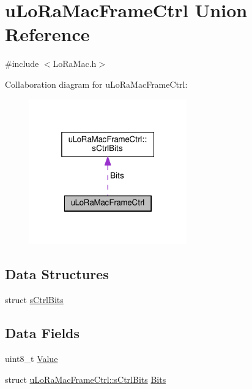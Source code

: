 \hypertarget{unionuLoRaMacFrameCtrl}{}\section{u\+Lo\+Ra\+Mac\+Frame\+Ctrl Union Reference}
\label{unionuLoRaMacFrameCtrl}


{\ttfamily \#include $<$Lo\+Ra\+Mac.\+h$>$}



Collaboration diagram for u\+Lo\+Ra\+Mac\+Frame\+Ctrl\+:
\nopagebreak
\begin{figure}[H]
\begin{center}
\leavevmode
\includegraphics[width=193pt]{unionuLoRaMacFrameCtrl__coll__graph}
\end{center}
\end{figure}
\subsection*{Data Structures}
\begin{DoxyCompactItemize}
\item 
struct \hyperlink{structuLoRaMacFrameCtrl_1_1sCtrlBits}{s\+Ctrl\+Bits}
\end{DoxyCompactItemize}
\subsection*{Data Fields}
\begin{DoxyCompactItemize}
\item 
uint8\+\_\+t \hyperlink{unionuLoRaMacFrameCtrl_a19009e145545052c0786ce3d9337aead}{Value}
\item 
struct \hyperlink{structuLoRaMacFrameCtrl_1_1sCtrlBits}{u\+Lo\+Ra\+Mac\+Frame\+Ctrl\+::s\+Ctrl\+Bits} \hyperlink{unionuLoRaMacFrameCtrl_aceae433bef08dcb31c0972b204f88e68}{Bits}
\end{DoxyCompactItemize}



